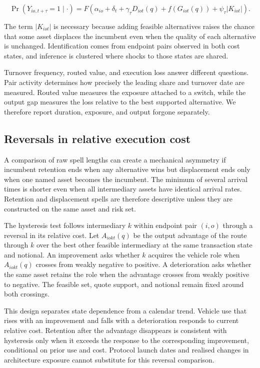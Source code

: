 \begin{equation}
\Pr(Y_{io,t+\tau}=1\mid\cdot)=F\!\left(\alpha_{io}+\delta_t+\gamma_{\tau}D_{iot}(q)+f\!\left(G_{iot}(q)\right)+\psi_{\tau}|K_{iot}|\right).
\label{eq:turnover-regression}
\end{equation}

The term $|K_{iot}|$ is necessary because adding feasible alternatives raises the chance that some asset displaces the incumbent even when the quality of each alternative is unchanged. Identification comes from endpoint pairs observed in both cost states, and inference is clustered where shocks to those states are shared.

Turnover frequency, routed value, and execution loss answer different questions. Pair activity determines how precisely the leading share and turnover date are measured. Routed value measures the exposure attached to a switch, while the output gap measures the loss relative to the best supported alternative. We therefore report duration, exposure, and output forgone separately.

\subsection{Reversals in relative execution cost}
\label{sec:survival:reversal}

A comparison of raw spell lengths can create a mechanical asymmetry if incumbent retention ends when any alternative wins but displacement ends only when one named asset becomes the incumbent. The minimum of several arrival times is shorter even when all intermediary assets have identical arrival rates. Retention and displacement spells are therefore descriptive unless they are constructed on the same asset and risk set.

The hysteresis test follows intermediary $k$ within endpoint pair $(i,o)$ through a reversal in its relative cost. Let $A_{iokt}(q)$ be the output advantage of the route through $k$ over the best other feasible intermediary at the same transaction state and notional. An improvement asks whether $k$ acquires the vehicle role when $A_{iokt}(q)$ crosses from weakly negative to positive. A deterioration asks whether the same asset retains the role when the advantage crosses from weakly positive to negative. The feasible set, quote support, and notional remain fixed around both crossings.

This design separates state dependence from a calendar trend. Vehicle use that rises with an improvement and falls with a deterioration responds to current relative cost. Retention after the advantage disappears is consistent with hysteresis only when it exceeds the response to the corresponding improvement, conditional on prior use and cost. Protocol launch dates and realised changes in architecture exposure cannot substitute for this reversal comparison.

